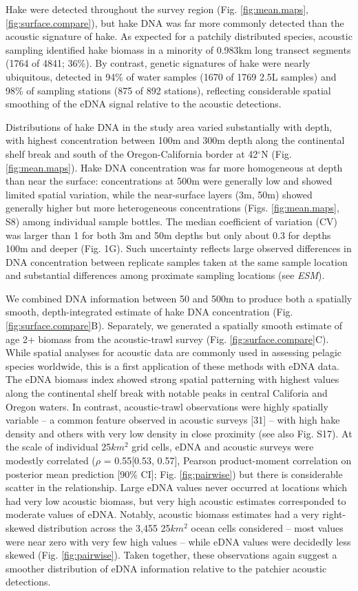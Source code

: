 \documentclass[
]{article}
\begin{document}
Hake were detected throughout the survey region (Fig. \ref{fig:mean.maps}, \ref{fig:surface.compare}), 
but hake DNA was far more commonly detected than the acoustic signature of hake. As
expected for a patchily distributed species, acoustic sampling
identified hake biomass in a minority of 0.983km long transect segments
(1764 of 4841; 36\%). By contrast, genetic signatures of
hake were nearly ubiquitous, detected in 94\% of water samples (1670 of
1769 2.5L samples) and 98\% of sampling stations (875 of 892 stations),
reflecting considerable spatial smoothing of the eDNA signal relative to
the acoustic detections.

Distributions of hake DNA in the study area varied
substantially with depth, with highest concentration between 100m and
300m depth along the continental shelf break and south of the
Oregon-California border at 42\(^{\circ}\)N (Fig. \ref{fig:mean.maps}).
Hake DNA concentration was far more homogeneous at depth than near the
surface: concentrations at 500m were generally low and showed limited
spatial variation, while the near-surface layers (3m, 50m) showed
generally higher but more heterogeneous concentrations (Figs.
\ref{fig:mean.maps}, S8) among individual sample bottles. The median
coefficient of variation (CV) was larger than 1 for both 3m and 50m
depths but only about 0.3 for depths 100m and deeper (Fig. 1G). Such
uncertainty reflects large observed differences in DNA concentration
between replicate samples taken at the same sample location and
substantial differences among proximate sampling locations (see
\emph{ESM}).

We combined DNA information between 50 and 500m to produce both a
spatially smooth, depth-integrated estimate of hake DNA concentration
(Fig. \ref{fig:surface.compare}B). Separately, we generated a spatially
smooth estimate of age 2+ biomass from the acoustic-trawl survey (Fig.
\ref{fig:surface.compare}C). While spatial analyses for acoustic data are commonly used in
assessing pelagic species worldwide, this is a first application of these methods with eDNA data. 
The eDNA biomass index showed strong spatial patterning
with highest values along the continental shelf break with notable peaks
in central Califoria and Oregon waters. In contrast, acoustic-trawl
observations were highly spatially variable -- a common feature observed in
acoustic surveys {[}31{]} -- with high hake density and
others with very low density in close proximity (see also Fig. S17).
At the scale of individual 25\(km^2\) grid cells, eDNA and acoustic
surveys were modestly correlated (\(\rho\) = 0.55{[}0.53, 0.57{]},
Pearson product-moment correlation on posterior mean prediction {[}90\%
CI{]}; Fig. \ref{fig:pairwise}) but there is considerable scatter in the
relationship. Large eDNA values never occurred at locations which had
very low acoustic biomass, but very high acoustic estimates corresponded
to moderate values of eDNA. Notably, acoustic biomass estimates had a
very right-skewed distribution across the 3,455 25\(km^2\) ocean cells
considered -- most values were near zero with very few high values --
while eDNA values were decidedly less skewed (Fig. \ref{fig:pairwise}).
Taken together, these observations again suggest a smoother distribution
of eDNA information relative to the patchier acoustic detections.
\end{document}
